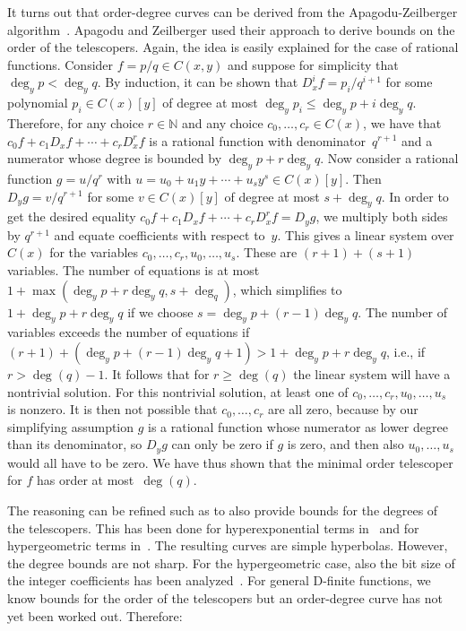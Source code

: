 \documentclass[a4paper,draft]{amsart}
\let\set\mathbb
\begin{document}
 It turns out that order-degree curves can be derived from the Apagodu-Zeilberger algorithm~\cite{mohammed05}.
 Apagodu and Zeilberger used their approach to derive bounds on the order of the telescopers. Again, the idea
 is easily explained for the case of rational functions. Consider $f=p/q\in C(x,y)$ and suppose for simplicity
 that $\deg_y p<\deg_y q$. By induction, it can be shown that $D_x^i f = p_i/q^{i+1}$ for some polynomial
 $p_i\in C(x)[y]$ of degree at most $\deg_y p_i\leq \deg_y p + i\deg_y q$. Therefore, for any choice $r\in\set N$
 and any choice $c_0,\dots,c_r\in C(x)$, we have that $c_0 f + c_1 D_x f + \cdots + c_r D_x^r f$ is a rational
 function with denominator~$q^{r+1}$ and a numerator whose degree is bounded by $\deg_y p+r\deg_y q$.
 Now consider a rational function $g=u/q^r$ with $u=u_0+u_1y+\cdots+u_sy^s\in C(x)[y]$.
 Then $D_y g=v/q^{r+1}$ for some $v\in C(x)[y]$ of degree at most $s + \deg_yq$.
 In order to get the desired equality $c_0 f + c_1 D_x f + \cdots + c_r D_x^r f=D_y g$, we multiply both
 sides by $q^{r+1}$ and equate coefficients with respect to~$y$.
 This gives a linear system over $C(x)$ for the variables $c_0,\dots,c_r,u_0,\dots,u_s$.
 These are $(r+1)+(s+1)$ variables.
 The number of equations is at most $1+\max(\deg_y p+r\deg_y q,s+\deg_q)$, which simplifies
 to $1+\deg_y p+r\deg_y q$ if we choose $s=\deg_y p+(r-1)\deg_y q$.
 The number of variables exceeds the number of equations if $(r+1)+(\deg_y p+(r-1)\deg_y q+1)>1+\deg_y p+r\deg_y q$,
 i.e., if $r>\deg(q)-1$.
 It follows that for $r\geq\deg(q)$ the linear system will have a nontrivial solution.
 For this nontrivial solution, at least one of $c_0,\dots,c_r,u_0,\dots,u_s$ is nonzero.
 It is then not possible that $c_0,\dots,c_r$ are all zero, because by our simplifying assumption $g$ is a rational
 function whose numerator as lower degree than its denominator, so $D_yg$ can only be zero if $g$ is zero, and then
 also $u_0,\dots,u_s$ would all have to be zero.
 We have thus shown that the minimal order telescoper for $f$ has order at most~$\deg(q)$.

 The reasoning can be refined such as to also provide bounds for the degrees of the telescopers. This has
 been done for hyperexponential terms in~\cite{chen12b} and for hypergeometric terms in~\cite{chen12c}. The resulting curves
 are simple hyperbolas. However, the degree bounds are not sharp. For the hypergeometric case, also the
 bit size of the integer coefficients has been analyzed~\cite{kauers14d}.
 For general D-finite functions, we know bounds for the order of the telescopers but an order-degree curve
 has not yet been worked out. Therefore:
\end{document}
